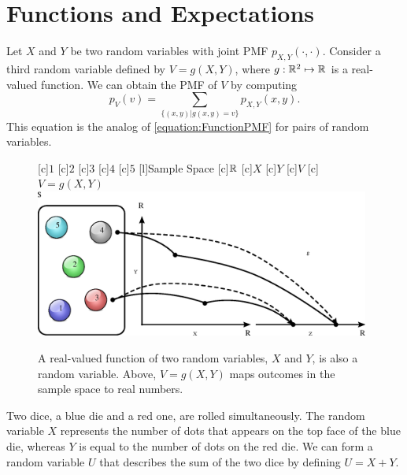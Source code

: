 \section{Functions and Expectations}

Let $X$ and $Y$ be two random variables with joint PMF $p_{X,Y} (\cdot, \cdot)$.
Consider a third random variable defined by $V = g(X,Y)$, where $g : \mathbb{R}^2 \mapsto \mathbb{R}$ is a real-valued function.
We can obtain the PMF of $V$ by computing
\begin{equation*}
p_V (v)
= \sum_{\{ (x,y) | g(x,y) = v \}} p_{X,Y} (x, y).
\end{equation*}
This equation is the analog of \eqref{equation:FunctionPMF} for pairs of random variables.

\begin{figure}[ht]
\begin{center}
\begin{psfrags}
[c]{$1$}
[c]{$2$}
[c]{$3$}
[c]{$4$}
[c]{$5$}
[l]{Sample Space}
[c]{$\mathbb{R}$}
[c]{$X$}
[c]{$Y$}
[c]{$V$}
[c]{$V = g(X,Y)$}
\includegraphics[width=11cm]{Figures/7Chapter/vfcn}
\end{psfrags}
\caption{A real-valued function of two random variables, $X$ and $Y$, is also a random variable.
Above, $V = g(X, Y)$ maps outcomes in the sample space to real numbers.}
\end{center}
\end{figure}

\begin{example} \label{example:SumDice1}
Two dice, a blue die and a red one, are rolled simultaneously.
The random variable $X$ represents the number of dots that appears on the top face of the blue die, whereas $Y$ is equal to the number of dots on the red die.
We can form a random variable $U$ that describes the sum of the two dice by defining $U = X + Y$.
\end{example}

